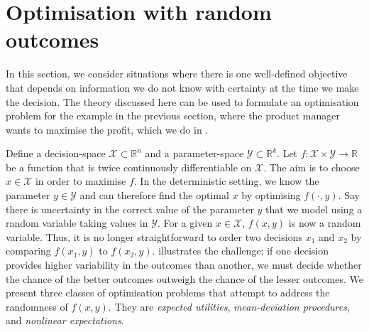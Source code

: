\documentclass[main.tex]{subfiles}
\begin{document}
\section{Optimisation with random outcomes}\label{sec:one_optim_random_outcomes}
In this section, we consider situations where there is one
well-defined objective that depends on  information we do not know
with certainty at the time we make the decision.
The theory discussed here can be used to formulate an optimisation problem
for the example in the previous section, where the product manager
wants to maximise the profit, which we do in
.

Define a decision-space $\mathcal{X}\subset \mathbb{R}^n$ and a
parameter-space $\mathcal{Y}\subset \mathbb{R}^k$.
Let $f:\mathcal{X}\times\mathcal{Y}\to\mathbb{R}$ be a function that
is twice continuously differentiable on $\mathcal{X}$.
The aim is to choose $x\in\mathcal{X}$ in order to maximise $f$.
In the deterministic setting, we know the parameter
$y\in\mathcal{Y}$ and can therefore find the optimal $x$ by optimising
$f(\cdot,y)$.
Say there is uncertainty in the correct value of the parameter $y$ that
we model using a random variable
taking values in $\mathcal{Y}$.
For a given $x\in\mathcal{X}$, $f(x,y)$ is now a random variable.
Thus, it is no longer straightforward to order two decisions $x_1$ and
$x_2$ by comparing $f(x_1,y)$ to $f(x_2,y)$.
 illustrates the challenge;
if one decision provides higher variability in the outcomes than
another, we must decide whether the chance of the better outcomes
outweigh the chance of the lesser outcomes.
We present three classes of optimisation problems that attempt to
address the randomness of $f(x,y)$. They are \emph{expected
  utilities}, \emph{mean-deviation procedures}, and \emph{nonlinear
  expectations}.
\end{document}
